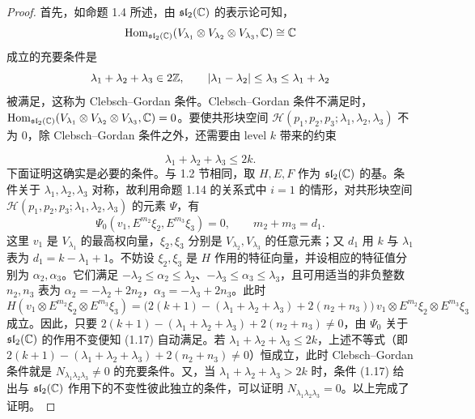\begin{proof}
首先，如命题 1.4 所述，由 $\mathfrak{sl}_2(\mathbb{C})$ 的表示论可知，
\[
  \operatorname{Hom}_{\mathfrak{sl}_2(\mathbb{C})}(V_{\lambda_1}\otimes V_{\lambda_2}\otimes V_{\lambda_3},\mathbb{C})\cong\mathbb{C}
\]
成立的充要条件是
\[
  \lambda_1+\lambda_2+\lambda_3\in2\mathbb{Z},\qquad
  |\lambda_1-\lambda_2|\le\lambda_3\le\lambda_1+\lambda_2
\]
被满足，这称为 Clebsch--Gordan 条件。Clebsch--Gordan 条件不满足时，$\operatorname{Hom}_{\mathfrak{sl}_2(\mathbb{C})}(V_{\lambda_1}\otimes V_{\lambda_2}\otimes V_{\lambda_3},\mathbb{C})=0$。要使共形块空间 $\mathcal{H}(p_1,p_2,p_3;\lambda_1,\lambda_2,\lambda_3)$ 不为 $0$，除 Clebsch--Gordan 条件之外，还需要由 level $k$ 带来的约束

\[
  \lambda_1+\lambda_2+\lambda_3\le2k .
\]
下面证明这确实是必要的条件。与 1.2 节相同，取 $H,E,F$ 作为 $\mathfrak{sl}_2(\mathbb{C})$ 的基。条件关于 $\lambda_1,\lambda_2,\lambda_3$ 对称，故利用命题 1.14 的关系式中 $i=1$ 的情形，对共形块空间 $\mathcal{H}(p_1,p_2,p_3;\lambda_1,\lambda_2,\lambda_3)$ 的元素 $\Psi$，有
\begin{equation}
  \Psi_0(v_1,E^{m_2}\xi_2,E^{m_3}\xi_3)=0,\qquad m_2+m_3=d_1 .
  \tag{1.17}
\end{equation}
这里 $v_1$ 是 $V_{\lambda_1}$ 的最高权向量，$\xi_2,\xi_3$ 分别是 $V_{\lambda_2},V_{\lambda_3}$ 的任意元素；又 $d_1$ 用 $k$ 与 $\lambda_1$ 表为 $d_1=k-\lambda_1+1$。不妨设 $\xi_2,\xi_3$ 是 $H$ 作用的特征向量，并设相应的特征值分别为 $\alpha_2,\alpha_3$。它们满足 $-\lambda_2\le\alpha_2\le\lambda_2$、$-\lambda_3\le\alpha_3\le\lambda_3$，且可用适当的非负整数 $n_2,n_3$ 表为 $\alpha_2=-\lambda_2+2n_2$，$\alpha_3=-\lambda_3+2n_3$。此时
\[
  H(v_1\otimes E^{m_2}\xi_2\otimes E^{m_3}\xi_3)
  =\bigl(2(k+1)-(\lambda_1+\lambda_2+\lambda_3)+2(n_2+n_3)\bigr)\,
  v_1\otimes E^{m_2}\xi_2\otimes E^{m_3}\xi_3
\]
成立。因此，只要 $2(k+1)-(\lambda_1+\lambda_2+\lambda_3)+2(n_2+n_3)\ne0$，由 $\Psi_0$ 关于 $\mathfrak{sl}_2(\mathbb{C})$ 的作用不变便知 (1.17) 自动满足。若 $\lambda_1+\lambda_2+\lambda_3\le2k$，上述不等式（即 $2(k+1)-(\lambda_1+\lambda_2+\lambda_3)+2(n_2+n_3)\ne0$）恒成立，此时 Clebsch--Gordan 条件就是 $N_{\lambda_1\lambda_2\lambda_3}\ne0$ 的充要条件。又，当 $\lambda_1+\lambda_2+\lambda_3>2k$ 时，条件 (1.17) 给出与 $\mathfrak{sl}_2(\mathbb{C})$ 作用下的不变性彼此独立的条件，可以证明 $N_{\lambda_1\lambda_2\lambda_3}=0$。以上完成了证明。
\end{proof}


